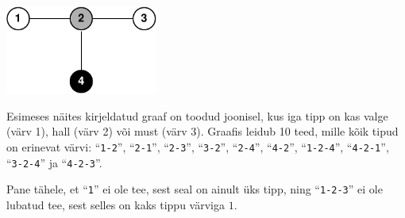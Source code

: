 \section*{}

\includegraphics[width=5cm]{pathsfig.pdf}

Esimeses näites kirjeldatud graaf on toodud joonisel, kus iga tipp on kas valge (värv 1), hall (värv 2) või must (värv 3). 
Graafis leidub 10 teed, mille kõik tipud on erinevat värvi: ``\texttt{1-2}'', ``\texttt{2-1}'', ``\texttt{2-3}'', ``\texttt{3-2}'', ``\texttt{2-4}'', ``\texttt{4-2}'', ``\texttt{1-2-4}'', ``\texttt{4-2-1}'', ``\texttt{3-2-4}'' ja ``\texttt{4-2-3}''.

Pane tähele, et ``\texttt{1}'' ei ole tee, sest seal on ainult üks tipp, ning ``\texttt{1-2-3}'' ei ole lubatud tee, sest selles on kaks tippu värviga $1$.
